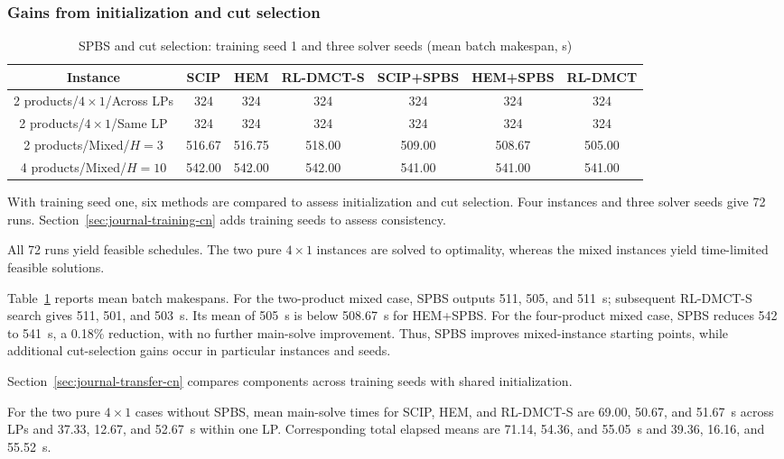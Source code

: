 \documentclass[final,5p,times,twocolumn]{elsarticle}
\newcounter{algorithm}
\begin{document}
\subsubsection{Gains from initialization and cut selection}
\label{sec:journal-ablation-cn}


\begin{table}[!t]
\centering\small
\caption{SPBS and cut selection: training seed 1 and three solver seeds (mean batch makespan, s)}
\label{tab:journal-algorithm-cn}
\setlength{\tabcolsep}{3.5pt}
\begin{tabular}{ccccccc}\toprule
Instance & SCIP & HEM & RL-DMCT-S & SCIP+SPBS & HEM+SPBS & RL-DMCT\\\midrule
2 products/$4\times1$/Across LPs & 324 & 324 & 324 & 324 & 324 & 324\\
2 products/$4\times1$/Same LP & 324 & 324 & 324 & 324 & 324 & 324\\
2 products/Mixed/$H=3$ & 516.67 & 516.75 & 518.00 & 509.00 & 508.67 & 505.00\\
4 products/Mixed/$H=10$ & 542.00 & 542.00 & 542.00 & 541.00 & 541.00 & 541.00\\
\bottomrule\end{tabular}
\end{table}


With training seed one, six methods are compared to assess initialization and cut selection. Four instances and three solver seeds give 72 runs. Section~\ref{sec:journal-training-cn} adds training seeds to assess consistency.

All 72 runs yield feasible schedules. The two pure $4\times1$ instances are solved to optimality, whereas the mixed instances yield time-limited feasible solutions.

Table~\ref{tab:journal-algorithm-cn} reports mean batch makespans. For the two-product mixed case, SPBS outputs 511, 505, and 511~s; subsequent RL-DMCT-S search gives 511, 501, and 503~s. Its mean of 505~s is below 508.67~s for HEM+SPBS. For the four-product mixed case, SPBS reduces 542 to 541~s, a 0.18\% reduction, with no further main-solve improvement. Thus, SPBS improves mixed-instance starting points, while additional cut-selection gains occur in particular instances and seeds.

Section~\ref{sec:journal-transfer-cn} compares components across training seeds with shared initialization.

For the two pure $4\times1$ cases without SPBS, mean main-solve times for SCIP, HEM, and RL-DMCT-S are 69.00, 50.67, and 51.67~s across LPs and 37.33, 12.67, and 52.67~s within one LP. Corresponding total elapsed means are 71.14, 54.36, and 55.05~s and 39.36, 16.16, and 55.52~s.
\end{document}
